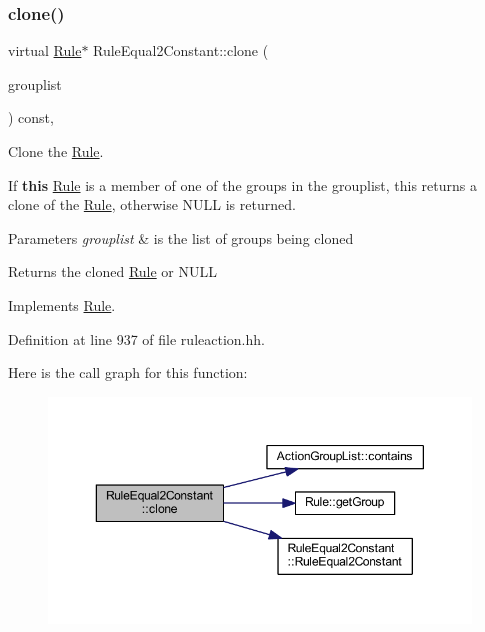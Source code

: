 \subsubsection{\texorpdfstring{clone()}{clone()}}
{\footnotesize\ttfamily virtual \mbox{\hyperlink{class_rule}{Rule}}$\ast$ Rule\+Equal2\+Constant\+::clone (\begin{DoxyParamCaption}\item[{const \mbox{\hyperlink{class_action_group_list}{Action\+Group\+List}} \&}]{grouplist }\end{DoxyParamCaption}) const\hspace{0.3cm}{\ttfamily [inline]}, {\ttfamily [virtual]}}



Clone the \mbox{\hyperlink{class_rule}{Rule}}. 

If {\bfseries{this}} \mbox{\hyperlink{class_rule}{Rule}} is a member of one of the groups in the grouplist, this returns a clone of the \mbox{\hyperlink{class_rule}{Rule}}, otherwise N\+U\+LL is returned. 
\begin{DoxyParams}{Parameters}
{\em grouplist} & is the list of groups being cloned \\
\hline
\end{DoxyParams}
\begin{DoxyReturn}{Returns}
the cloned \mbox{\hyperlink{class_rule}{Rule}} or N\+U\+LL 
\end{DoxyReturn}


Implements \mbox{\hyperlink{class_rule_a70de90a76461bfa7ea0b575ce3c11e4d}{Rule}}.



Definition at line 937 of file ruleaction.\+hh.

Here is the call graph for this function\+:
\nopagebreak
\begin{figure}[H]
\begin{center}
\leavevmode
\includegraphics[width=350pt]{class_rule_equal2_constant_a69a9a14451113af78875906090e19929_cgraph}
\end{center}
\end{figure}
\mbox{\label{class_rule_equal2_constant_afe6e48806c7403838f841ee463e15e7b}} 
